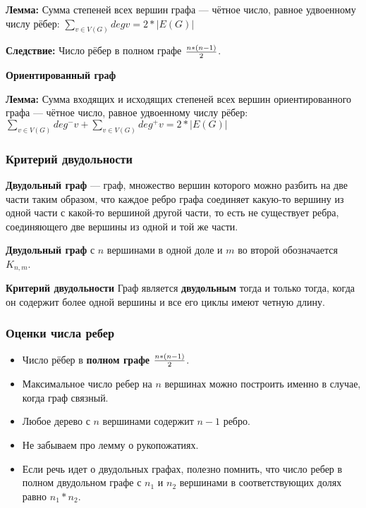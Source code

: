 \documentclass[12pt]{matmex-diploma}
\begin{document}
            \textbf{Лемма:}
            Сумма степеней всех вершин графа — чётное число, равное удвоенному числу рёбер:
            $\sum_{v \in V(G)} deg v = 2*|E(G)|$
            
            \textbf{Следствие:}
            Число рёбер в полном графе ${n*(n-1)} \over 2$.
            
            \textbf{Ориентированный граф}
            
            \textbf{Лемма:}
            Сумма входящих и исходящих степеней всех вершин ориентированного графа — чётное число, равное удвоенному числу рёбер: 
            $\sum_{v \in V(G)} deg^- v + \sum_{v \in V(G)} deg^+ v = 2*|E(G)|$
            
        \subsubsection*{Критерий двудольности}
        
            \textbf{Двудольный граф} — граф, множество вершин которого можно разбить на две части таким образом, что каждое ребро графа соединяет какую-то вершину из одной части с какой-то вершиной другой части, то есть не существует ребра, соединяющего две вершины из одной и той же части. 
            
            \textbf{Двудольный граф} с $n$ вершинами в одной доле и $m$ во второй обозначается $K_{n,m}$.
            
            \textbf{Критерий двудольности}
            Граф является \textbf{двудольным} тогда и только тогда, когда он содержит более одной вершины и все его циклы имеют четную длину.
            
        \subsubsection*{Оценки числа ребер}
            
            \begin{itemize}
                \item Число рёбер в \textbf{полном графе} ${n*(n-1)} \over 2$.
                \item Максимальное число ребер на $n$ вершинах можно построить именно в случае, когда граф связный.
                \item Любое дерево с $n$ вершинами содержит $n-1$ ребро.
                \item Не забываем про лемму о рукопожатиях.
                \item Если речь идет о двудольных графах, полезно помнить, что число ребер в полном двудольном графе с $n_1$ и $n_2$ вершинами в соответствующих долях равно $n_1*n_2$.
            \end{itemize}
            
\end{document}
